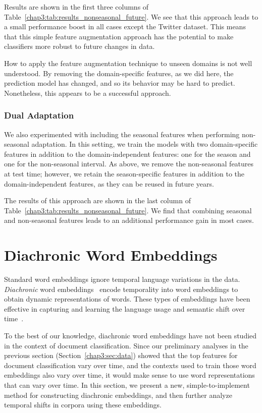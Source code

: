 Results are shown in the first three columns of Table~\ref{chap3:tab:results_nonseasonal_future}.
We see that this approach leads to a small performance boost in all cases except the Twitter dataset. 
This means that this simple feature augmentation approach has the potential to make classifiers more robust to future changes in data.

How to apply the feature augmentation technique to unseen domains is not well understood.
By removing the domain-specific features, as we did here, the prediction model has changed, and so its behavior may be hard to predict.
Nonetheless, this appears to be a successful approach.

\subsubsection{Dual Adaptation}

We also experimented with including the seasonal features when performing non-seasonal adaptation.
In this setting, we train the models with two domain-specific features in addition to the domain-independent features: one for the season and one for the non-seasonal interval. 
As above, we remove the non-seasonal features at test time; however, we retain the season-specific features in addition to the domain-independent features, as they can be reused in future years.

The results of this approach are shown in the last column of Table~\ref{chap3:tab:results_nonseasonal_future}.
We find that combining seasonal and non-seasonal features leads to an additional performance gain in most cases.


\section{Diachronic Word Embeddings}
\label{chap3:sec:dwe}

Standard word embeddings ignore temporal language variations in the data.
\textit{Diachronic} word embeddings~\cite{kulkarni2015statistically} 
encode temporality into word embeddings to obtain dynamic representations of words. 
These types of embeddings have been effective in capturing and learning the language usage and semantic shift over time~\cite{kim2014temporal, kulkarni2015statistically, hamilton2016diachronic, bamler2017dynamic, szymanski2017temporal, rudolph2018dynamic, rosenfeld2018deep, yao2018dynamic}. 

To the best of our knowledge, diachronic word embeddings have not been studied in the context of document classification. 
Since our preliminary analyses in the previous section (Section~\ref{chap3:sec:data}) showed that the top features for document classification vary over time, and the contexts used to train those word embeddings also vary over time, 
it would make sense to use word representations that can vary over time.
In this section, we present a new, simple-to-implement method for constructing diachronic embeddings, and then further analyze temporal shifts in corpora using these embeddings.

